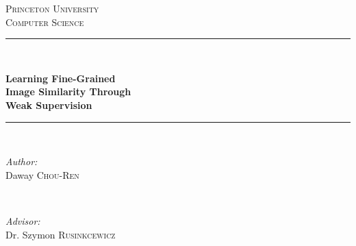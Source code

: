\documentclass[11pt, notitlepage]{report}
\begin{document}
\hypersetup{pageanchor=false}
\begin{titlepage}

\newcommand{\HRule}{\rule{.8\linewidth}{0.5mm}} %
\renewenvironment{abstract}
 {\small
  \begin{center}
  \bfseries \abstractname\vspace{-.5em}\vspace{0pt}
  \end{center}
  \list{}{
    \setlength{\leftmargin}{.5cm}%
    \setlength{\rightmargin}{\leftmargin}%
  }%
  \item\relax}
 {\endlist}


\center %


\textsc{\LARGE Princeton University}\\[0.5cm] %
\textsc{\large Computer Science}\\[0.5cm] %

\vspace{2em}

\HRule \\[0.2cm]
{\LARGE \bfseries Learning Fine-Grained\\
	Image Similarity Through\\
	Weak Supervision\\
\par}
\HRule \\[1.5cm]
 
\vspace{2em}

\begin{minipage}{0.4\textwidth}
\begin{flushleft} \large
\emph{Author:}\\
Daway \textsc{Chou-Ren} %
\end{flushleft}
\end{minipage}
~
\begin{minipage}{0.4\textwidth}
\begin{flushright} \large
\emph{Advisor:} \\
Dr. Szymon \textsc{Rusinkcewicz} %
\end{flushright}
\end{minipage}\\[1cm]


\end{titlepage}
\end{document}
